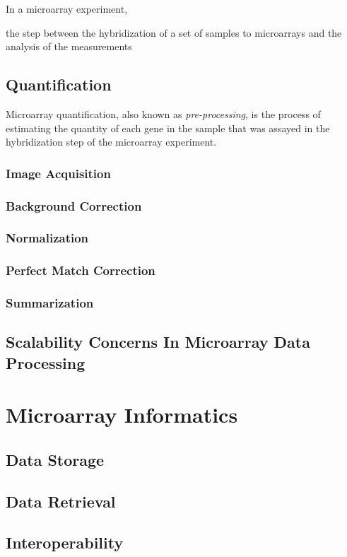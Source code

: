 In a microarray experiment, 

the step between the hybridization of a set of samples to microarrays and the analysis of the measurements

\subsection{Quantification}

Microarray quantification, also known as \emph{pre-processing}, is the
process of estimating the quantity of each gene in the sample that was assayed
in the hybridization step of the microarray experiment.

\subsubsection{Image Acquisition}
\subsubsection{Background Correction}
\subsubsection{Normalization}
\subsubsection{Perfect Match Correction}
\subsubsection{Summarization}
\subsection{Scalability Concerns In Microarray Data Processing}

\section{Microarray Informatics}
\subsection{Data Storage}
\subsection{Data Retrieval}
\subsection{Interoperability}
